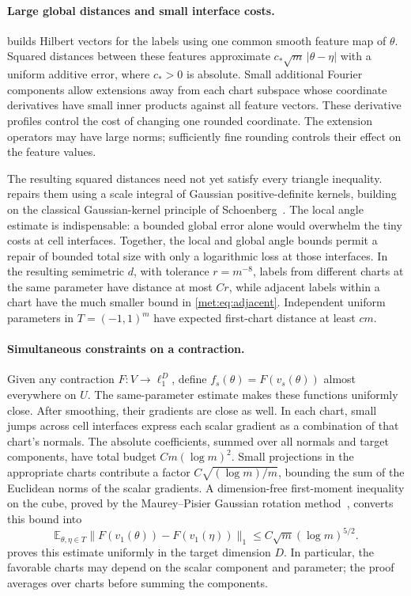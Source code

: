 \documentclass[11pt]{article}
\numberwithin{equation}{section}
\theoremstyle{definition}
\theoremstyle{remark}
\newcommand{\E}{\mathbb E}
\begin{document}
\paragraph{Large global distances and small interface costs.}
 builds Hilbert vectors for the labels using one common
smooth feature map of $\theta$. Squared distances between these features
approximate $c_*\sqrt m\,|\theta-\eta|$ with a uniform additive error,
where $c_*>0$ is absolute.
Small additional Fourier components allow extensions away from each
chart subspace whose coordinate derivatives have small inner products
against all feature vectors. These derivative profiles control the
cost of changing one rounded coordinate. The extension operators may
have large norms; sufficiently fine rounding controls their effect on
the feature values.

The resulting squared distances need not yet satisfy every triangle
inequality.  repairs them using a scale integral
of Gaussian positive-definite kernels, building on the classical
Gaussian-kernel principle of Schoenberg~\cite{Sch38}. The local angle
estimate is indispensable: a bounded global error alone would overwhelm
the tiny costs at cell interfaces. Together, the local and global angle
bounds permit a repair of bounded total size with only a logarithmic
loss at those interfaces. In the resulting semimetric $d$, with
tolerance $r=m^{-8}$, labels from different charts at
the same parameter have distance at most $Cr$, while adjacent labels
within a chart have the much smaller bound in
\eqref{met:eq:adjacent}. Independent uniform parameters in
$T=(-1,1)^m$ have expected first-chart distance at least $cm$.

\paragraph{Simultaneous constraints on a contraction.}
Given any contraction $F:V\to\ell_1^D$, define
$f_s(\theta)=F(v_s(\theta))$ almost everywhere on $U$.
The same-parameter estimate makes these functions uniformly close.
After smoothing, their gradients are close as well. In each chart,
small jumps across cell interfaces express each scalar gradient as a
combination of that chart's normals. The absolute coefficients, summed
over all normals and target components, have total budget $Cm(\log m)^2$. Small projections in the appropriate charts contribute
a factor $C\sqrt{(\log m)/m}$, bounding the sum of the Euclidean norms
of the scalar gradients. A dimension-free
first-moment inequality on the cube, proved by the Maurey--Pisier
Gaussian rotation method~\cite{Pis86}, converts this bound into
\[
 \E_{\theta,\eta\in T}
 \|F(v_1(\theta))-F(v_1(\eta))\|_1
 \le C\sqrt m(\log m)^{5/2}.
\]
 proves this estimate uniformly in the target
dimension $D$. In particular, the favorable charts may depend on the
scalar component and parameter; the proof averages over charts before
summing the components.
\end{document}
